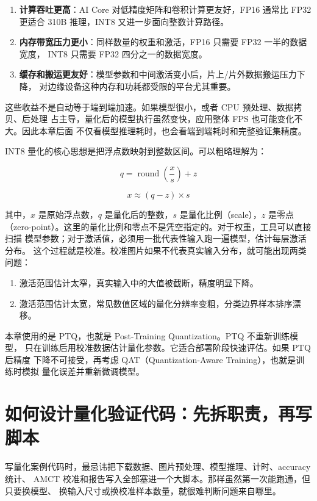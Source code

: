 \begin{enumerate}
\def\labelenumi{\arabic{enumi}.}
\tightlist
\item
  \textbf{计算吞吐更高}：AI Core 对低精度矩阵和卷积计算更友好，FP16
  通常比 FP32 更适合 310B 推理，INT8 又进一步面向整数计算路径。
\item
  \textbf{内存带宽压力更小}：同样数量的权重和激活，FP16 只需要 FP32
  一半的数据宽度， INT8 只需要 FP32 四分之一的数据宽度。
\item
  \textbf{缓存和搬运更友好}：模型参数和中间激活变小后，片上/片外数据搬运压力下降，
  对边缘设备这种内存和功耗都受限的平台尤其重要。
\end{enumerate}

这些收益不是自动等于端到端加速。如果模型很小，或者 CPU
预处理、数据拷贝、后处理 占主导，量化后的模型执行虽然变快，应用整体 FPS
也可能变化不大。因此本章后面
不仅看模型推理耗时，也会看端到端耗时和完整验证集精度。

INT8 量化的核心思想是把浮点数映射到整数区间。可以粗略理解为：

\[
q = \operatorname{round}\left(\frac{x}{s}\right) + z
\]

\[
x \approx (q - z) \times s
\]

其中，\(x\) 是原始浮点数，\(q\) 是量化后的整数，\(s\)
是量化比例（scale），\(z\) 是零点
（zero-point）。这里的量化比例和零点不是凭空指定的。对于权重，工具可以直接扫描
模型参数；对于激活值，必须用一批代表性输入跑一遍模型，估计每层激活分布。
这个过程就是校准。校准图片如果不代表真实输入分布，就可能出现两类问题：

\begin{enumerate}
\def\labelenumi{\arabic{enumi}.}
\tightlist
\item
  激活范围估计太窄，真实输入中的大值被截断，精度明显下降。
\item
  激活范围估计太宽，常见数值区域的量化分辨率变粗，分类边界样本排序漂移。
\end{enumerate}

本章使用的是 PTQ，也就是 Post-Training Quantization。PTQ
不重新训练模型，
只在训练后用校准数据估计量化参数。它适合部署阶段快速评估。如果 PTQ
后精度 下降不可接受，再考虑 QAT（Quantization-Aware
Training），也就是训练时模拟 量化误差并重新微调模型。

\section{如何设计量化验证代码：先拆职责，再写脚本}\label{src-book-chapter9-h3}

写量化案例代码时，最忌讳把下载数据、图片预处理、模型推理、计时、accuracy
统计、 AMCT
校准和报告写入全部塞进一个大脚本。那样虽然第一次能跑通，但只要换模型、
换输入尺寸或换校准样本数量，就很难判断问题来自哪里。

